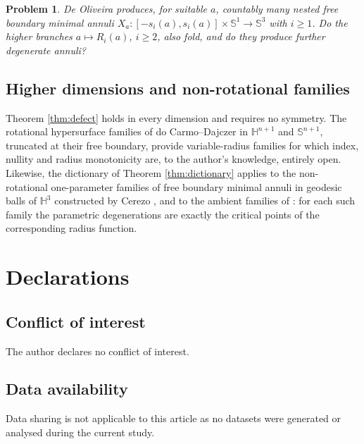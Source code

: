 \documentclass[10pt,a4paper]{amsart}
\newtheorem{problem}[theorem]{Problem}
\newcommand{\Sph}{\mathbb{S}}
\newcommand{\Hyp}{\mathbb{H}}
\begin{document}
\begin{problem}\label{prob:otherbranches}
De Oliveira \cite[Thm. 3.2]{dO24} produces, for suitable $a$, countably many nested free boundary minimal annuli $X_a:[-s_i(a),s_i(a)]\times\Sph^1\to\Sph^3$ with $i\geq 1$. Do the higher branches $a\mapsto R_i(a)$, $i\geq 2$, also fold, and do they produce further degenerate annuli?
\end{problem}

\subsection*{Higher dimensions and non-rotational families}

Theorem \ref{thm:defect} holds in every dimension and requires no symmetry. The rotational hypersurface families of do Carmo--Dajczer \cite{dCD83} in $\Hyp^{n+1}$ and $\Sph^{n+1}$, truncated at their free boundary, provide variable-radius families for which index, nullity and radius monotonicity are, to the author's knowledge, entirely open. Likewise, the dictionary of Theorem \ref{thm:dictionary} applies to the non-rotational one-parameter families of free boundary minimal annuli in geodesic balls of $\Hyp^3$ constructed by Cerezo \cite{Cer25}, and to the ambient families of \cite{CFM25,FHM23}: for each such family the parametric degenerations are exactly the critical points of the corresponding radius function.

\section*{Declarations}

\subsection*{Conflict of interest}

The author declares no conflict of interest.

\subsection*{Data availability}

Data sharing is not applicable to this article as no datasets were generated or analysed during the current study.
\end{document}
